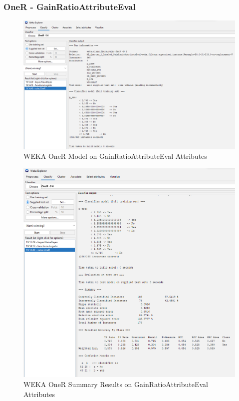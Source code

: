 \documentclass[12pt]{article}
\begin{document}
\subsubsection{OneR - GainRatioAttributeEval}
\begin{figure}[h!]
    \includegraphics[scale=0.4]{./images/GainRatioAttributeEval/OneR-Model.png}
\centering
    \caption{WEKA OneR Model on GainRatioAttributeEval Attributes}
\end{figure}
\newpage
\begin{figure}[h!]
    \includegraphics[scale=0.4]{./images/GainRatioAttributeEval/OneR-Summary.png}
\centering
    \caption{WEKA OneR Summary Results on GainRatioAttributeEval Attributes}
\end{figure}
\end{document}
